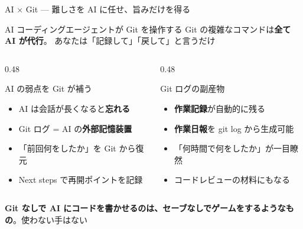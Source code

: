 \documentclass[aspectratio=169, 14pt]{beamer}
\newcommand{\warn}[1]{\textcolor{sfred}{\textbf{#1}}}
\begin{document}
\begin{frame}{AI × Git — 難しさを AI に任せ、旨みだけを得る}
  \begin{block}{AI コーディングエージェントが Git を操作する}
    {\small
    Git の複雑なコマンドは\textbf{全て AI が代行}。
    あなたは「記録して」「戻して」と言うだけ}
  \end{block}

  \vspace{0.3em}

  \begin{columns}[T]
    \begin{column}{0.48\textwidth}
      \begin{exampleblock}{AI の弱点を Git が補う}
        \begin{itemize}\footnotesize
          \item AI は会話が長くなると\textbf{忘れる}
          \item Git ログ = AI の\textbf{外部記憶装置}
          \item 「前回何をしたか」を Git から復元
          \item Next steps で再開ポイントを記録
        \end{itemize}
      \end{exampleblock}
    \end{column}
    \begin{column}{0.48\textwidth}
      \begin{block}{Git ログの副産物}
        \begin{itemize}\footnotesize
          \item \textbf{作業記録}が自動的に残る
          \item \textbf{作業日報}を git log から生成可能
          \item 「何時間で何をしたか」が一目瞭然
          \item コードレビューの材料にもなる
        \end{itemize}
      \end{block}
    \end{column}
  \end{columns}

  \vspace{0.3em}

  {\footnotesize \warn{Git なしで AI にコードを書かせるのは、セーブなしでゲームをするようなもの}。使わない手はない}
\end{frame}
\end{document}
